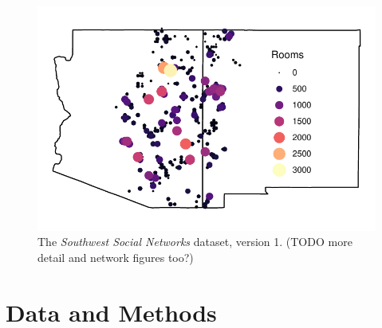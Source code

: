\documentclass[10pt]{iopart}
\begin{document}

\begin{figure}[!htbp]
\centering
\includegraphics[width=.9\linewidth]{figures/site_distribution.pdf}
\caption{The \emph{Southwest Social Networks} dataset, version 1. (TODO more detail and network figures too?)} 
\label{fig:network-plot}
\end{figure}

\section*{Data and Methods}
\end{document}
